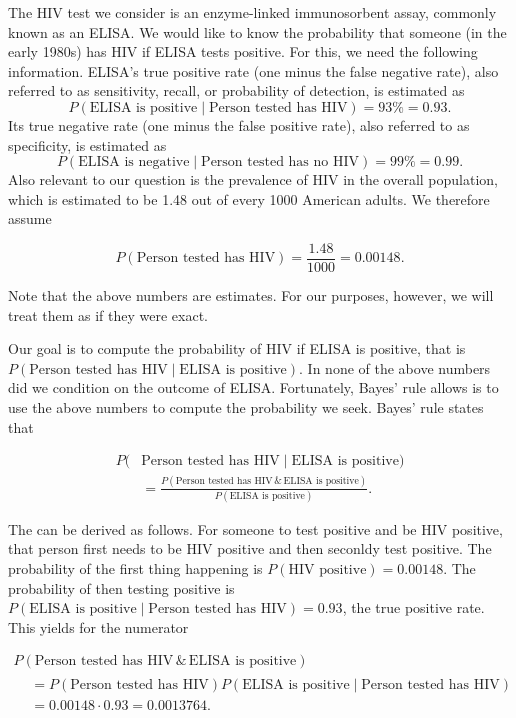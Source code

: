 \documentclass[]{book}
\theoremstyle{definition}
\theoremstyle{definition}
\theoremstyle{definition}
\theoremstyle{remark}
\begin{document}
The HIV test we consider is an enzyme-linked immunosorbent assay,
commonly known as an ELISA. We would like to know the probability that
someone (in the early 1980s) has HIV if ELISA tests positive. For this,
we need the following information. ELISA's true positive rate (one minus
the false negative rate), also referred to as sensitivity, recall, or
probability of detection, is estimated as \[
  P(\text{ELISA is positive} \mid \text{Person tested has HIV}) = 93\% = 0.93.
\] Its true negative rate (one minus the false positive rate), also
referred to as specificity, is estimated as \[
  P(\text{ELISA is negative} \mid \text{Person tested has no HIV}) = 99\% = 0.99.
\] Also relevant to our question is the prevalence of HIV in the overall
population, which is estimated to be 1.48 out of every 1000 American
adults. We therefore assume

\begin{equation}
  P(\text{Person tested has HIV}) = \frac{1.48}{1000} = 0.00148.
  \label{eq:HIVpositive}
\end{equation}

Note that the above numbers are estimates. For our purposes, however, we
will treat them as if they were exact.

Our goal is to compute the probability of HIV if ELISA is positive, that
is \(P(\text{Person tested has HIV} \mid \text{ELISA is positive})\). In
none of the above numbers did we condition on the outcome of ELISA.
Fortunately, Bayes' rule allows is to use the above numbers to compute
the probability we seek. Bayes' rule states that

\[
  \begin{aligned}
  P(&\text{Person tested has HIV}  \mid \text{ELISA is positive}) \\
   & = \frac{P(\text{Person tested has HIV} \,\&\, \text{ELISA is positive})}{P(\text{ELISA is positive})}.
\end{aligned}  
\label{eq:HIVconditional}
\]

The can be derived as follows. For someone to test positive and be HIV
positive, that person first needs to be HIV positive and then seconldy
test positive. The probability of the first thing happening is
\(P(\text{HIV positive}) = 0.00148\). The probability of then testing
positive is
\(P(\text{ELISA is positive} \mid \text{Person tested has HIV}) = 0.93\),
the true positive rate. This yields for the numerator

\begin{multline*}
  P(\text{Person tested has HIV} \,\&\, \text{ELISA is positive}) \\
  \begin{split}
  &= P(\text{Person tested has HIV}) P(\text{ELISA is positive} \mid \text{Person tested has HIV}) \\
  &= 0.00148 \cdot 0.93
  = 0.0013764.
  \end{split}
  \label{eq:HIVjoint}
\end{multline*}
\end{document}
